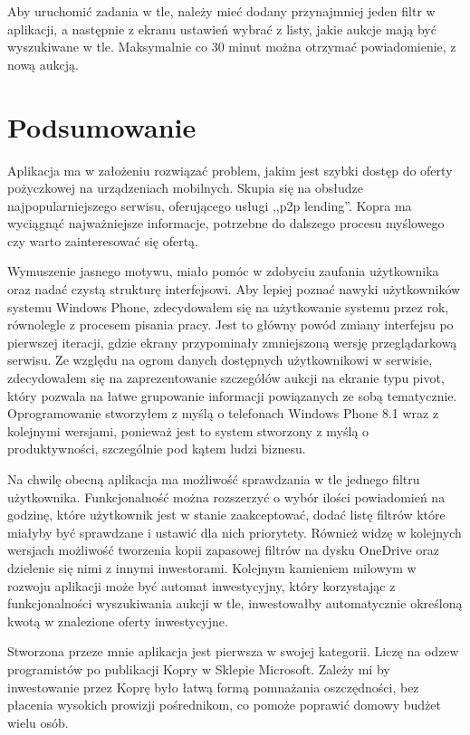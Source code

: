 \documentclass[a4paper,twoside,titlepage,openright]{book}
\begin{document}
Aby uruchomić zadania w tle, należy mieć dodany przynajmniej jeden filtr w aplikacji, a następnie z ekranu ustawień wybrać z listy, jakie aukcje mają być wyszukiwane w tle. Maksymalnie co 30 minut można otrzymać powiadomienie, z nową aukcją.
 
 

 
\clearpage{\pagestyle{empty}\cleardoublepage}
\chapter{Podsumowanie}
Aplikacja ma w założeniu rozwiązać problem, jakim jest szybki dostęp do oferty pożyczkowej na urządzeniach mobilnych. Skupia się na obsłudze najpopularniejszego serwisu, oferującego usługi ,,p2p lending''. Kopra ma wyciągnąć najważniejsze informacje, potrzebne do dalszego procesu myślowego czy warto zainteresować się ofertą. 

Wymuszenie jasnego motywu, miało pomóc w zdobyciu zaufania użytkownika oraz nadać czystą strukturę interfejsowi. Aby lepiej poznać nawyki użytkowników systemu Windows Phone, zdecydowałem się na użytkowanie systemu przez rok, równolegle z procesem pisania pracy. Jest to główny powód zmiany interfejsu po pierwszej iteracji, gdzie ekrany przypominały zmniejszoną wersję przeglądarkową serwisu. Ze względu na ogrom danych dostępnych użytkownikowi w serwisie, zdecydowałem się na zaprezentowanie szczegółów aukcji na ekranie typu pivot, który pozwala na łatwe grupowanie informacji powiązanych ze sobą tematycznie. 
Oprogramowanie stworzyłem z myślą o telefonach Windows Phone 8.1 wraz z kolejnymi wersjami, ponieważ jest to system stworzony z myślą o produktywności, szczególnie pod kątem ludzi biznesu. 

Na chwilę obecną aplikacja ma możliwość sprawdzania w tle jednego filtru użytkownika. Funkcjonalność można rozszerzyć o wybór ilości powiadomień na godzinę, które użytkownik jest w stanie zaakceptować, dodać listę filtrów które miałyby być sprawdzane i ustawić dla nich priorytety. Również widzę w kolejnych wersjach możliwość tworzenia kopii zapasowej filtrów na dysku OneDrive oraz dzielenie się nimi z innymi inwestorami. Kolejnym kamieniem milowym w rozwoju aplikacji może być automat inwestycyjny, który korzystając z funkcjonalności wyszukiwania aukcji w tle, inwestowałby automatycznie określoną kwotą w znalezione oferty inwestycyjne.

Stworzona przeze mnie aplikacja jest pierwsza w swojej kategorii. Liczę na odzew programistów po publikacji Kopry w Sklepie Microsoft. Zależy mi by inwestowanie przez Koprę było łatwą formą pomnażania oszczędności, bez płacenia wysokich prowizji pośrednikom, co pomoże poprawić domowy budżet wielu osób.
 
\end{document}
